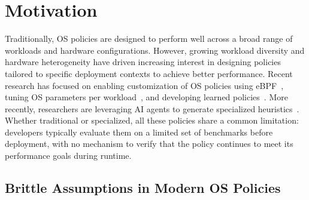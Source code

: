 \section{Motivation}\label{sec:background}\label{sec:motivating}


Traditionally, OS policies are designed to perform well across a broad range of workloads and hardware configurations. However, growing workload diversity and hardware heterogeneity have driven increasing interest in designing policies tailored to specific deployment contexts to achieve better performance.
Recent research has focused on enabling customization of OS policies using eBPF~\cite{sched-ext,cache-ext-sosp25,pageflex2025}, tuning OS parameters per workload~\cite{tuning-pacmi25,agentic-tuning-ml4sys25}, and developing learned policies~\cite{heimdall-eurosys25,orca-sigcomm20,kml-tos23,kleio-hpdc19,linnos-osdi20}. More recently, researchers are leveraging AI agents to generate specialized heuristics~\cite{policysmith-hotnets25,glia-arxiv25,barbarians25,vulcan-arxiv25,agentic-os-ml4sys25}.
Whether traditional or specialized, all these policies share a common limitation: developers typically evaluate them on a limited set of benchmarks before deployment, with no mechanism to verify that the policy continues to meet its performance goals during runtime.


\subsection{Brittle Assumptions in Modern OS Policies}

